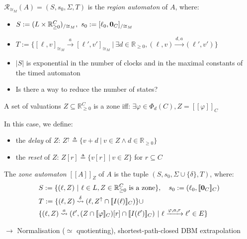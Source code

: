 \documentclass{beamer}
\theoremstyle{definition}
\newcommand{\xra}[1]{\overset{#1}{\rightsquigarrow}}
\begin{document}
\begin{frame}
\begin{definition}
  $\mathcal{R}_{\cong_M}(A) = (S, s_0, \Sigma, T)$ is the \emph{region automaton} of $A$, where:
  \begin{itemize}
    \item $S := (L \times \mathbb{R}_{\geq 0}^C)_{/\cong_M},\ s_0 := [\ell_0, \text{\bf 0}_C]_{/\cong_M}$
    \item $T := \{[\ell, v]_{\cong_M} \xrightarrow{a} [\ell', v']_{\cong_M}\ |\ \exists d \in \mathbb{R}_{\geq 0}, (\ell, v) \xrightarrow{d, a} (\ell', v')\}$
  \end{itemize}
\end{definition}
\begin{itemize}
  \item<2> $\left| S \right|$ is exponential in the number of clocks and in the maximal constants of the timed automaton
  \item<2> Is there a way to reduce the number of states?
\end{itemize}
\end{frame}

\begin{frame}
  \small
  \begin{definition}[Zone]
    A set of valuations $Z \subseteq \mathbb{R}_{\geq 0}^C$ is a zone iff:
    $\exists \varphi \in \varPhi_d(C), Z = [\![\varphi]\!]_C$
    
    In this case, we define:
    \begin{itemize}
      \item the \emph{delay} of $Z$: $Z^\uparrow \triangleq \{ v + d \ |\ v \in Z \land d \in \mathbb{R}_{\geq 0}\}$
      \item the \emph{reset} of $Z$: $Z[r] \triangleq \{ v[r] \ |\ v \in Z\}$ for $r \subseteq C$
    \end{itemize}
  \end{definition}
  \small
  \begin{definition}
    The \emph{zone automaton} $[\![A]\!]_Z$ of $A$ is the tuple $(S, s_0, \Sigma \cup \{\delta\}, T)$, where:
    \begin{align*}
      &S := \{ (\ell, Z)\ |\ \ell \in L, Z \in \mathbb{R}_{\geq 0}^C\ \text{is a zone}\},\quad s_0 := (\ell_0, [\![\text{\bf 0}_C]\!]_C)\\
      &T := \{ (\ell, Z) \xra{\delta} (\ell, Z^\uparrow \cap [\![I(\ell)]\!]_C)\} \cup \\
      &\{ (\ell, Z) \xra{a} (\ell', (Z \cap [\![\varphi]\!]_C)[r] \cap [\![I(\ell')]\!]_C) \ |\ \ell \xrightarrow{\varphi, a, r} \ell' \in E\}
    \end{align*}
  \end{definition}
  $\rightarrow$ Normalisation ($\simeq$ quotienting), shortest-path-closed DBM extrapolation
\end{frame}
\end{document}
